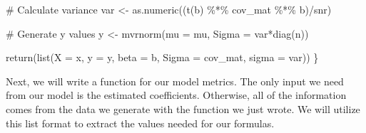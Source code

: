 \documentclass[
  letterpaper,
]{latex/krantz}
\makeatletter
\newenvironment{Shaded}{\begin{snugshade}}{\end{snugshade}}
\newcommand{\AttributeTok}[1]{\textcolor[rgb]{0.40,0.45,0.13}{#1}}
\newcommand{\CommentTok}[1]{\textcolor[rgb]{0.37,0.37,0.37}{#1}}
\newcommand{\FunctionTok}[1]{\textcolor[rgb]{0.28,0.35,0.67}{#1}}
\newcommand{\NormalTok}[1]{\textcolor[rgb]{0.00,0.23,0.31}{#1}}
\newcommand{\OtherTok}[1]{\textcolor[rgb]{0.00,0.23,0.31}{#1}}
\newcommand{\SpecialCharTok}[1]{\textcolor[rgb]{0.37,0.37,0.37}{#1}}
\newenvironment{kframe}{%
\medskip{}
\setlength{\fboxsep}{.8em}
 \def\at@end@of@kframe{}%
 \ifinner\ifhmode%
  \def\at@end@of@kframe{\end{minipage}}%
  \begin{minipage}{\columnwidth}%
 \fi\fi%
 \def\FrameCommand##1{\hskip\@totalleftmargin \hskip-\fboxsep
 \colorbox{shadecolor}{##1}\hskip-\fboxsep
     \hskip-\linewidth \hskip-\@totalleftmargin \hskip\columnwidth}%
 \MakeFramed {\advance\hsize-\width
   \@totalleftmargin\z@ \linewidth\hsize
   \@setminipage}}%
 {\par\unskip\endMakeFramed%
 \at@end@of@kframe}
\renewenvironment{Shaded}{\begin{kframe}}{\end{kframe}}
\makeatother
\begin{document}
\begin{Shaded}
\begin{Highlighting}[]
  \CommentTok{\# Calculate variance}
\NormalTok{  var }\OtherTok{\textless{}{-}} \FunctionTok{as.numeric}\NormalTok{((}\FunctionTok{t}\NormalTok{(b) }\SpecialCharTok{\%*\%}\NormalTok{ cov\_mat }\SpecialCharTok{\%*\%}\NormalTok{ b)}\SpecialCharTok{/}\NormalTok{snr)}

  \CommentTok{\# Generate y values}
\NormalTok{  y }\OtherTok{\textless{}{-}} \FunctionTok{mvrnorm}\NormalTok{(}\AttributeTok{mu =}\NormalTok{ mu, }\AttributeTok{Sigma =}\NormalTok{ var}\SpecialCharTok{*}\FunctionTok{diag}\NormalTok{(n))}
  
  \FunctionTok{return}\NormalTok{(}\FunctionTok{list}\NormalTok{(}\AttributeTok{X =}\NormalTok{ x, }\AttributeTok{y =}\NormalTok{ y, }\AttributeTok{beta =}\NormalTok{ b, }\AttributeTok{Sigma =}\NormalTok{ cov\_mat, }\AttributeTok{sigma =}\NormalTok{ var))}
\NormalTok{\}}
\end{Highlighting}
\end{Shaded}

Next, we will write a function for our model metrics. The only input we
need from our model is the estimated coefficients. Otherwise, all of the
information comes from the data we generate with the function we just
wrote. We will utilize this list format to extract the values needed for
our formulas.
\end{document}
